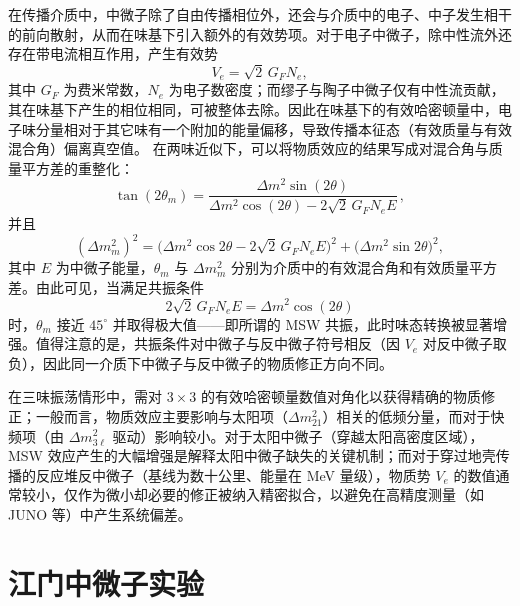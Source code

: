 在传播介质中，中微子除了自由传播相位外，还会与介质中的电子、中子发生相干的前向散射，从而在味基下引入额外的有效势项。对于电子中微子，除中性流外还存在带电流相互作用，产生有效势\cite{Wolfenstein1978,Mikheyev1985}
\begin{equation}
V_e=\sqrt{2}\,G_F N_e,
\label{eq:Ve-matter}
\end{equation}
其中 $G_F$ 为费米常数，$N_e$ 为电子数密度；而缪子与陶子中微子仅有中性流贡献，其在味基下产生的相位相同，可被整体去除。因此在味基下的有效哈密顿量中，电子味分量相对于其它味有一个附加的能量偏移，导致传播本征态（有效质量与有效混合角）偏离真空值。
在两味近似下，可以将物质效应的结果写成对混合角与质量平方差的重整化\cite{Wolfenstein1978Matter, Mikheyev1985Resonance}：
\begin{equation}
\tan(2\theta_m)=\frac{\Delta m^2\sin(2\theta)}
{\Delta m^2\cos(2\theta)-2\sqrt{2}\,G_FN_e E}\,,
\label{eq:tan-2theta-m}
\end{equation}
并且
\begin{equation}
(\Delta m^2_m)^2=\bigl(\Delta m^2\cos2\theta-2\sqrt{2}\,G_FN_eE\bigr)^2
+\bigl(\Delta m^2\sin2\theta\bigr)^2,
\label{eq:dm2m-squared}
\end{equation}
其中 $E$ 为中微子能量，$\theta_m$ 与 $\Delta m^2_m$ 分别为介质中的有效混合角和有效质量平方差。由此可见，当满足共振条件
\begin{equation}
2\sqrt{2}\,G_FN_e E = \Delta m^2\cos(2\theta)
\label{eq:msw-resonance}
\end{equation}
时，$\theta_m$ 接近 $45^\circ$ 并取得极大值——即所谓的 MSW 共振，此时味态转换被显著增强\cite{Mikheyev1985Resonance, Bethe1986Possible}。值得注意的是，共振条件对中微子与反中微子符号相反（因 $V_e$ 对反中微子取负），因此同一介质下中微子与反中微子的物质修正方向不同。

在三味振荡情形中，需对 $3\times3$ 的有效哈密顿量数值对角化以获得精确的物质修正\cite{Zaglauer1988Analytic}；一般而言，物质效应主要影响与太阳项（$\Delta m^2_{21}$）相关的低频分量，而对于快频项（由 $\Delta m^2_{3\ell}$ 驱动）影响较小。对于太阳中微子（穿越太阳高密度区域），MSW 效应产生的大幅增强是解释太阳中微子缺失的关键机制\cite{SNO2002Solar}；而对于穿过地壳传播的反应堆反中微子（基线为数十公里、能量在 MeV 量级），物质势 $V_e$ 的数值通常较小，仅作为微小却必要的修正被纳入精密拟合，以避免在高精度测量（如 JUNO 等）中产生系统偏差\cite{JUNO2016YellowBook, Khan2015Matter}。

\section{江门中微子实验}

